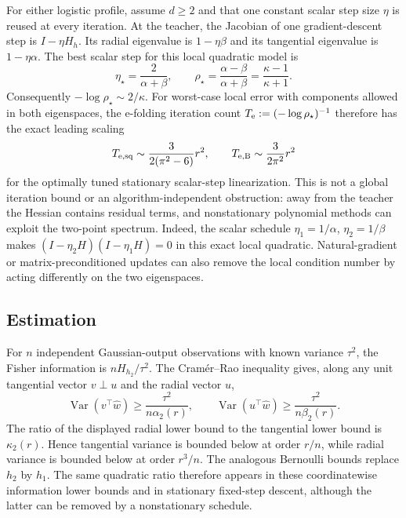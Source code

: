 \documentclass[11pt]{article}
\begin{document}
For either logistic profile, assume $d\ge2$ and that one constant scalar step size $\eta$ is reused at every
iteration.  At the teacher, the
Jacobian of one gradient-descent step is $I-\eta H_h$.  Its radial eigenvalue is
$1-\eta\beta$ and its tangential eigenvalue is $1-\eta\alpha$.  The best scalar step for this local quadratic model is
\begin{equation}
 \eta_\star=\frac{2}{\alpha+\beta},\qquad
 \rho_\star=\frac{\alpha-\beta}{\alpha+\beta}=\frac{\kappa-1}{\kappa+1}.
 \label{eq:optrate}
\end{equation}
Consequently $-\log\rho_\star\sim2/\kappa$.  For worst-case local error with components allowed in both
eigenspaces, the e-folding iteration count
$T_{\rm e}:=(-\log\rho_\star)^{-1}$ therefore has the exact leading scaling
\begin{equation}
 T_{{\rm e},\rm sq}\sim\frac{3}{2(\pi^2-6)}r^2,\qquad
 T_{{\rm e},\rm B}\sim\frac3{2\pi^2}r^2
 \label{eq:iterationtax}
\end{equation}
for the optimally tuned stationary scalar-step linearization.  This is not a global iteration bound or an
algorithm-independent obstruction: away from the teacher the Hessian contains residual terms, and nonstationary
polynomial methods can exploit the two-point spectrum.  Indeed, the scalar schedule
$\eta_1=1/\alpha$, $\eta_2=1/\beta$ makes
$(I-\eta_2H)(I-\eta_1H)=0$ in this exact local quadratic.  Natural-gradient or matrix-preconditioned updates can
also remove the local condition number by acting differently on the two eigenspaces.

\subsection{Estimation}

For $n$ independent Gaussian-output observations with known variance $\tau^2$, the Fisher information is
$nH_{h_2}/\tau^2$.  The Cram\'er--Rao inequality gives, along any unit tangential vector $v\perp u$ and the radial
vector $u$,
\begin{equation}
 \operatorname{Var}(v^\top\widehat w)\ge\frac{\tau^2}{n\alpha_2(r)},\qquad
 \operatorname{Var}(u^\top\widehat w)\ge\frac{\tau^2}{n\beta_2(r)}.
 \label{eq:crgauss}
\end{equation}
The ratio of the displayed radial lower bound to the tangential lower bound is $\kappa_2(r)$.  Hence tangential
variance is bounded below at order $r/n$, while radial variance is bounded below at order
$r^3/n$.  The analogous Bernoulli bounds replace $h_2$ by $h_1$.  The same quadratic ratio therefore appears in
these coordinatewise information lower bounds and in stationary fixed-step descent, although the latter can be
removed by a nonstationary schedule.
\end{document}
